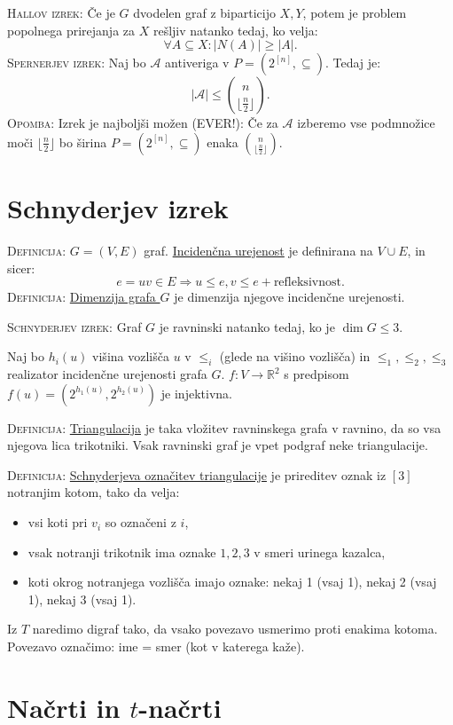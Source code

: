 \documentclass[8pt,a4paper]{amsart}
\theoremstyle{definition} %
\theoremstyle{plain} %
\newcommand{\R}{\mathbb R}
\begin{document}
\textsc{Hallov izrek:} Če je $G$ dvodelen graf z biparticijo $X,Y$, potem je problem popolnega prirejanja za $X$ rešljiv natanko tedaj, ko velja:
$$
\forall A \subseteq X: |N(A)| \geq |A|.
$$
\textsc{Spernerjev izrek:} Naj bo $\mathcal{A}$ antiveriga v $P=(2^{[n]},\subseteq)$. Tedaj je:
$$
|\mathcal{A}| \leq \binom{n}{\lfloor \frac{n}{2} \rfloor }.
$$
\textsc{Opomba:} Izrek je najboljši možen (EVER!): Če za $\mathcal{A}$ izberemo vse podmnožice moči $\lfloor \frac{n}{2} \rfloor $ bo širina $P=(2^{[n]},\subseteq)$ enaka $\binom{n}{ \lfloor \frac{n}{2} \rfloor}$.

\section{Schnyderjev izrek}

\textsc{Definicija:} $G=(V,E)$ graf. \underline{Incidenčna urejenost} je definirana na $V \cup E$, in sicer:
$$
e = uv \in E \Longrightarrow u \leq e, v \leq e + \text{refleksivnost}.
$$
\textsc{Definicija:} \underline{Dimenzija grafa $G$} je dimenzija njegove incidenčne urejenosti.

\textsc{Schnyderjev izrek:} Graf $G$ je ravninski natanko tedaj, ko je $\dim{G} \leq 3$.

Naj bo $h_i(u)$ višina vozlišča $u$ v $\leq_i$ (glede na višino vozlišča) in $\leq_1, \leq_2, \leq_3$ realizator incidenčne urejenosti grafa $G$. $f: V \longrightarrow \R^2$ s predpisom $f(u)=(2^{h_1(u)},2^{h_2(u)})$ je injektivna.

\textsc{Definicija:} \underline{Triangulacija} je taka vložitev ravninskega grafa v ravnino, da so vsa njegova lica trikotniki. Vsak ravninski graf je vpet podgraf neke triangulacije.

\textsc{Definicija:} \underline{Schnyderjeva označitev triangulacije} je prireditev oznak iz $[3]$ notranjim kotom, tako da velja:
\begin{itemize}
\item vsi koti pri $v_i$ so označeni z $i$,
\item vsak notranji trikotnik ima oznake $1,2,3$ v smeri urinega kazalca,
\item koti okrog notranjega vozlišča imajo oznake: nekaj 1 (vsaj 1), nekaj 2 (vsaj 1), nekaj 3 (vsaj 1).
\end{itemize}

Iz $T$ naredimo digraf tako, da vsako povezavo usmerimo proti enakima kotoma. Povezavo označimo: ime = smer (kot v katerega kaže).

\section{Načrti in $t$-načrti}
\end{document}
